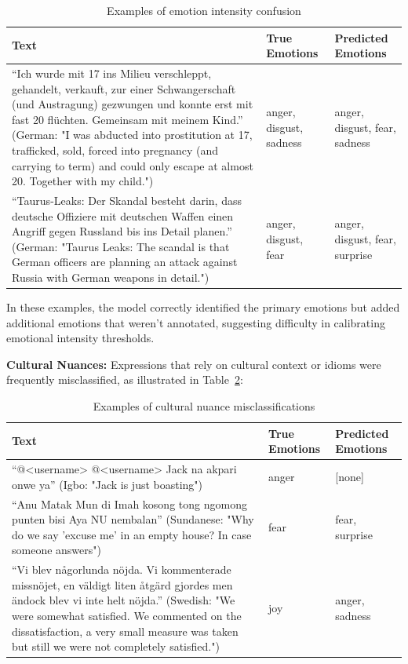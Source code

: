 \documentclass[a4paper,12pt]{extarticle}
\begin{document}
\begin{table}[h]
\centering
\begin{tabular}{|p{8.5cm}|p{2.5cm}|p{2.5cm}|}
\hline
\textbf{Text} & \textbf{True Emotions} & \textbf{Predicted Emotions} \\
\hline
``Ich wurde mit 17 ins Milieu verschleppt, gehandelt, verkauft, zur einer Schwangerschaft (und Austragung) gezwungen und konnte erst mit fast 20 flüchten. Gemeinsam mit meinem Kind.'' \newline (German: "I was abducted into prostitution at 17, trafficked, sold, forced into pregnancy (and carrying to term) and could only escape at almost 20. Together with my child.") & anger, disgust, sadness & anger, disgust, fear, sadness \\
\hline
``Taurus-Leaks: Der Skandal besteht darin, dass deutsche Offiziere mit deutschen Waffen einen Angriff gegen Russland bis ins Detail planen.'' \newline (German: "Taurus Leaks: The scandal is that German officers are planning an attack against Russia with German weapons in detail.") & anger, disgust, fear & anger, disgust, fear, surprise \\
\hline
\end{tabular}
\caption{Examples of emotion intensity confusion}
\label{tab:intensity-confusion}
\end{table}

In these examples, the model correctly identified the primary emotions but added additional emotions that weren't annotated, suggesting difficulty in calibrating emotional intensity thresholds.

\textbf{Cultural Nuances:} Expressions that rely on cultural context or idioms were frequently misclassified, as illustrated in Table~\ref{tab:cultural-nuances}:

\begin{table}[h]
\centering
\begin{tabular}{|p{8.5cm}|p{2.5cm}|p{2.5cm}|}
\hline
\textbf{Text} & \textbf{True Emotions} & \textbf{Predicted Emotions} \\
\hline
``@<username> @<username> Jack na akpari onwe ya'' \newline (Igbo: "Jack is just boasting") & anger & [none] \\
\hline
``Anu Matak Mun di Imah kosong tong ngomong punten bisi Aya NU nembalan'' \newline (Sundanese: "Why do we say 'excuse me' in an empty house? In case someone answers") & fear & fear, surprise \\
\hline
``Vi blev någorlunda nöjda. Vi kommenterade missnöjet, en väldigt liten åtgärd gjordes men ändock blev vi inte helt nöjda.'' \newline (Swedish: "We were somewhat satisfied. We commented on the dissatisfaction, a very small measure was taken but still we were not completely satisfied.") & joy & anger, sadness \\
\hline
\end{tabular}
\caption{Examples of cultural nuance misclassifications}
\label{tab:cultural-nuances}
\end{table}
\end{document}
